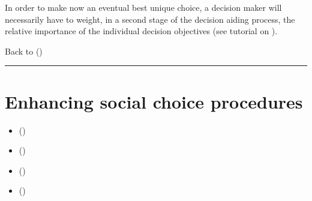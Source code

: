 \documentclass[a4paper,12pt,english]{sphinxhowto}
\begin{document}
\sphinxAtStartPar
In order to make now an eventual best unique choice, a decision maker will necessarily have to weight, in a second stage of the decision aiding process, the relative importance of the individual decision objectives (see tutorial on ).

\sphinxAtStartPar
Back to {\hyperref[\detokenize{pearls:pearls-label}]{}} ()


\bigskip\hrule\bigskip



\section{Enhancing social choice procedures}
\label{\detokenize{pearls:enhancing-social-choice-procedures}}\label{\detokenize{pearls:enhancing-social-choice-label}}
\begin{sphinxcontents}
\begin{itemize}
\item {} 
\sphinxAtStartPar
{}\label{\detokenize{pearls:id119}}{\hyperref[\detokenize{pearls:condorcet-s-critical-perspective-on-the-simple-plurality-voting-rule}]{}} ()

\item {} 
\sphinxAtStartPar
{}\label{\detokenize{pearls:id120}}{\hyperref[\detokenize{pearls:two-stage-elections-with-multipartisan-primary-selection}]{}} ()

\item {} 
\sphinxAtStartPar
{}\label{\detokenize{pearls:id121}}{\hyperref[\detokenize{pearls:tempering-plurality-tyranny-effects-with-bipolar-approval-voting}]{}} ()

\item {} 
\sphinxAtStartPar
{}\label{\detokenize{pearls:id122}}{\hyperref[\detokenize{pearls:selecting-the-winner-of-a-primary-election-a-critical-commentary}]{}} ()

\end{itemize}
\end{sphinxcontents}
\end{document}
